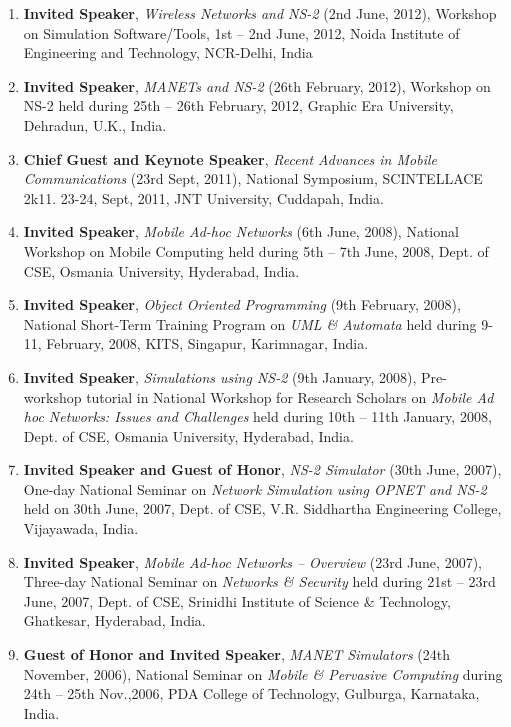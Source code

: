 \begin{enumerate}
\item
\textbf{Invited Speaker}, \textit{Wireless Networks and NS-2} (2nd June, 2012), Workshop on Simulation Software/Tools, 1st – 2nd June, 2012, Noida Institute of Engineering and Technology, NCR-Delhi, India

\item
\textbf{Invited Speaker}, \textit{MANETs and NS-2} (26th February, 2012), Workshop on NS-2 held during 25th – 26th February, 2012, Graphic Era University, Dehradun, U.K., India.

\item
\textbf{Chief Guest and Keynote Speaker}, \textit{Recent Advances in Mobile Communications} (23rd Sept, 2011), National Symposium, SCINTELLACE 2k11. 23-24, Sept, 2011, JNT University, Cuddapah, India.

\item
\textbf{Invited Speaker}, \textit{Mobile Ad-hoc Networks} (6th June, 2008), National Workshop on Mobile Computing held during 5th – 7th June, 2008, Dept. of CSE, Osmania University, Hyderabad, India.

\item
\textbf{Invited Speaker}, \textit{Object Oriented Programming} (9th February, 2008), National Short-Term Training Program on \textit{UML \& Automata} held during   9-11, February, 2008, KITS, Singapur, Karimnagar, India.

\item
\textbf{Invited Speaker}, \textit{Simulations using NS-2} (9th January, 2008), Pre-workshop tutorial in National Workshop for Research Scholars on \textit{Mobile Ad hoc Networks: Issues and Challenges} held during 10th – 11th January, 2008, Dept. of CSE, Osmania University, Hyderabad, India.

\item
\textbf{Invited Speaker and Guest of Honor}, \textit{NS-2 Simulator} (30th June, 2007),  One-day National Seminar on \textit{Network Simulation using OPNET and NS-2} held on 30th June, 2007, Dept. of CSE, V.R. Siddhartha Engineering College, Vijayawada, India.

\item
\textbf{Invited Speaker}, \textit{Mobile Ad-hoc Networks – Overview} (23rd June, 2007),  Three-day National Seminar on \textit{Networks \& Security} held during 21st – 23rd June, 2007, Dept. of CSE, Srinidhi Institute of Science \& Technology, Ghatkesar, Hyderabad, India.

\item
\textbf{Guest of Honor and Invited Speaker}, \textit{MANET Simulators} (24th November, 2006), National Seminar on \textit{Mobile \& Pervasive Computing} during 24th – 25th Nov.,2006, PDA College of Technology, Gulburga, Karnataka, India.


\end{enumerate}

